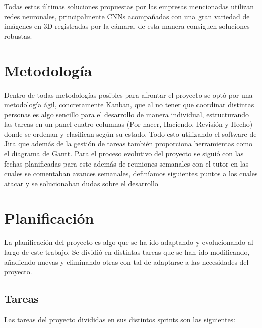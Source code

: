 ﻿\documentclass[10pt,a4paper,twocolumn,twoside]{article}
\begin{document}
Todas estas últimas soluciones propuestas por las empresas mencionadas utilizan redes neuronales, principalmente CNNs acompañadas con una gran variedad de imágenes en 3D registradas por la cámara, de esta manera consiguen soluciones robustas.



\section{Metodología}
Dentro de todas metodologías posibles para afrontar el proyecto se optó por una metodología ágil, concretamente Kanban, que al no tener que coordinar distintas personas es algo sencillo para el desarrollo de manera individual, estructurando las tareas en un panel cuatro columnas (Por hacer, Haciendo, Revisión y Hecho) donde se ordenan y clasifican según su estado.
Todo esto utilizando el software de Jira \cite{JIRA} que además de la gestión de tareas también proporciona herramientas como el diagrama de Gantt.
Para el proceso evolutivo del proyecto se siguió con las fechas planificadas para este además de reuniones semanales con el tutor en las cuales se comentaban avances semanales, definíamos siguientes puntos a los cuales atacar y se solucionaban dudas sobre el desarrollo

\section{Planificación}
La planificación del proyecto es algo que se ha ido adaptando y evolucionando al largo de este trabajo. Se dividió en distintas tareas que se han ido modificando, añadiendo nuevas y eliminando otras con tal de adaptarse a las necesidades del proyecto.
\subsection{Tareas}
Las tareas del proyecto divididas en sus distintos sprints son las siguientes:
\end{document}
